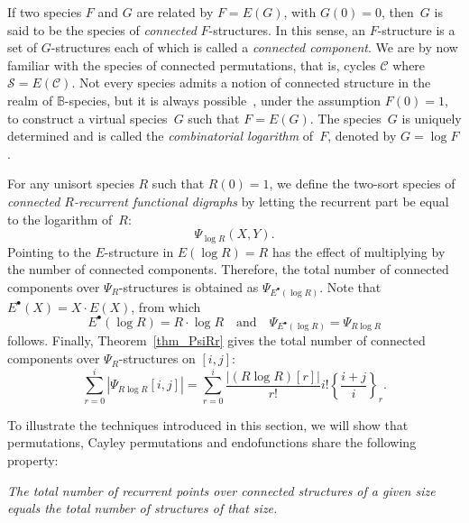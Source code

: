 \documentclass[a4paper,11pt,UKenglish]{article}
\newcommand{\BB}{\mathbb{B}}
\newcommand{\Set}{E}
\newcommand{\Sym}{\mathcal{S}}
\newcommand{\Cyc}{\mathcal{C}}
\newcommand{\sdiff}[3]{\genfrac{\{}{\}}{}{}{{#1}}{{#2}}_{{#3}}}
\theoremstyle{definition}
\begin{document}
If two species $F$ and $G$ are related by $F=\Set(G)$, with $G(0)=0$,
then~$G$ is said to be the species of \emph{connected} $F$-structures.
In this sense, an $F$-structure is a set of $G$-structures each of
which is called a \emph{connected component}.
We are by now familiar with the species of connected permutations,
that is, cycles $\Cyc$ where $\Sym=\Set(\Cyc)$.
Not every species admits a notion of connected
structure in the realm of $\BB$-species, but it is always
possible~\cite[Proposition 18]{BLL}, under the assumption $F(0)=1$, to construct a virtual
species~$G$ such that $F=\Set(G)$. The species~$G$ is uniquely
determined and is called the \emph{combinatorial logarithm} of~$F$,
denoted by $G=\log F$.

For any unisort species $R$ such that $R(0)=1$, we define the two-sort species of
\emph{connected $R$-recurrent functional digraphs} by letting
the recurrent part be equal to the logarithm of~$R$:
$$
\Psi_{\log R}(X,Y).
$$
Pointing to the $\Set$-structure in $\Set(\log R)=R$
has the effect of multiplying by the number of connected
components. Therefore, the total number of connected components over
$\Psi_R$-structures is obtained as $\Psi_{\Set^{\bullet}(\log R)}$.
Note that $\Set^{\bullet}(X)=X\cdot\Set(X)$, from which
\begin{equation}\label{eq_totcomp}
\Set^{\bullet}(\log R)=R\cdot\log R
\quad\text{and}\quad
\Psi_{\Set^{\bullet}(\log R)} = \Psi_{R\log R}
\end{equation}
follows.
Finally, Theorem~\ref{thm_PsiRr} gives the total number of
connected components over $\Psi_R$-structures on $[i,j]$:
\begin{equation}\label{eq_totcompnum}
\sum_{r=0}^i|\Psi_{R\log R}[i,j]|
=\sum_{r=0}^i\frac{|(R\log R)[r]|}{r!}i!\sdiff{i+j}{i}{r}.
\end{equation}

To illustrate the techniques introduced in this section, we will show
that permutations, Cayley permutations and endofunctions share the
following property:

\emph{The total number of recurrent points over connected structures of
  a given size equals the total number of structures of that size.}

\end{document}
